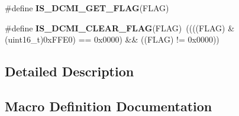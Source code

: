 \begin{DoxyCompactItemize}
\item 
\#define {\bfseries I\+S\+\_\+\+D\+C\+M\+I\+\_\+\+G\+E\+T\+\_\+\+F\+L\+A\+G}(F\+L\+A\+G)
\item 
\hypertarget{group___d_c_m_i___flags_gaf47c4a92fae67d5f5208ba0b222efa7a}{}\#define {\bfseries I\+S\+\_\+\+D\+C\+M\+I\+\_\+\+C\+L\+E\+A\+R\+\_\+\+F\+L\+A\+G}(F\+L\+A\+G)~((((F\+L\+A\+G) \& (uint16\+\_\+t)0x\+F\+F\+E0) == 0x0000) \&\& ((\+F\+L\+A\+G) != 0x0000))\label{group___d_c_m_i___flags_gaf47c4a92fae67d5f5208ba0b222efa7a}

\end{DoxyCompactItemize}


\subsection{Detailed Description}


\subsection{Macro Definition Documentation}
\hypertarget{group___d_c_m_i___flags_gaa0278161a8e39b18ecd4a3501c70e753}{}
